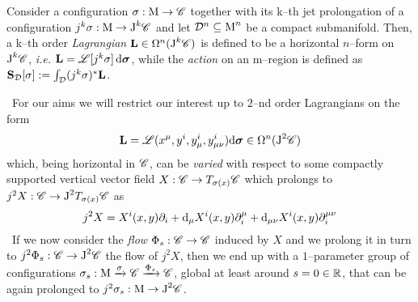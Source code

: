 \begin{defi}
     Consider a configuration $\sigma:\text{\normalfont M}\to\mathscr{C}$ together with its k--th jet prolongation of a configuration $j^k\sigma:\text{\normalfont M}\to\text{\normalfont J}^k\mathscr{C}$ and let $\mathcal{D}^n\subseteq\text{\normalfont M}^n$ be a compact submanifold. Then, a k--th order \emph{Lagrangian} $\mathbf{L}\in\Omega^n(\text{\normalfont J}^k\mathscr{C})$ is defined to be a horizontal $n$--form on $\text{\normalfont J}^k\mathscr{C}$, \emph{i.e.} $\mathbf{L}=\mathscr{L}[j^k\sigma]\,\text{\normalfont d}\boldsymbol{\sigma}$, %
     while the \emph{action} on an m--region is defined as $\mathbf{S}_{\mathcal{D}}[\sigma]:=\int_{\mathcal{D}} (j^k\sigma)^*\mathbf{L}$.
 \end{defi}
\,\newline
For our aims we will restrict our interest up to $2$--nd order Lagrangians on the form
$$\mathbf{L}=\mathscr{L}(x^\mu,y^i,y^i_\mu,y^i_{\mu\nu})\text{\normalfont d}\boldsymbol{\sigma}\in\Omega^n(\text{\normalfont J}^2\mathscr{C})$$
which, being horizontal in $\mathscr{C}$, can be \emph{varied} with respect to some compactly supported vertical vector field $X:\mathscr{C}\to T_{\sigma(x)}\mathscr{C}$ %
 which prolongs to $j^2X:\mathscr{C}\to\text{\normalfont J}^2T_{\sigma(x)}\mathscr{C}$ as 
 $$j^2X=X^i(x,y)\partial_i+\text{\normalfont d}_\mu X^i(x,y)\partial_i^\mu+\text{\normalfont d}_{\mu\nu}X^i(x,y)\partial_i^{\mu\nu}$$
\,\newline
If we now consider the \emph{flow} $\Phi_s:\mathscr{C}\to\mathscr{C}$ induced by $X$ and we prolong it in turn to $j^2\Phi_s:\mathscr{C}\to\text{\normalfont J}^2\mathscr{C}$ the flow of $j^2X$, then we end up with a $1$--parameter group of configurations $\sigma_s:\text{\normalfont M}\xrightarrow{\sigma}\mathscr{C}\xrightarrow{\Phi_s}\mathscr{C}$, global at least around $s=0\in\mathbb{R}$, that can be again prolonged to $j^2\sigma_s:\text{\normalfont M}\to\text{\normalfont J}^2\mathscr{C}$.


